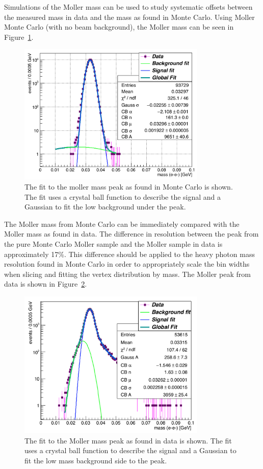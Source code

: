 \documentclass[twoside]{article}
\begin{document}
Simulations of the Moller mass can be used to study systematic offsets between the measured mass in data and the mass as found in Monte Carlo. Using Moller Monte Carlo (with no beam background), the Moller mass can be seen in Figure~\ref{fig:mollerMC_L1L1}. 

\begin{figure}[H]
  \centering
     \includegraphics[width=0.8\textwidth]{plots/mollerMassMC.png}
  \caption{The fit to the moller mass peak as found in Monte Carlo is shown. The fit uses a crystal ball function to describe the signal and a Gaussian to fit the low background under the peak.}
  \label{fig:mollerMC_L1L1}
\end{figure}

The Moller mass from Monte Carlo can be immediately compared with the Moller mass as found in data. The difference in resolution between the peak from the pure Monte Carlo Moller sample and the Moller sample in data is approximately 17$\%$. This difference should be applied to the heavy photon mass resolution found in Monte Carlo in order to appropriately scale the bin widths when slicing and fitting the vertex distribution by mass. The Moller peak from data is shown in Figure~\ref{fig:moller_L1L1}. 

\begin{figure}[H]
  \centering
     \includegraphics[width=0.8\textwidth]{plots/mollerMass.png}
  \caption{The fit to the Moller mass peak as found in data is shown. The fit uses a crystal ball function to describe the signal and a Gaussian to fit the low mass background side to the peak.}
  \label{fig:moller_L1L1}
\end{figure} 
\end{document}
